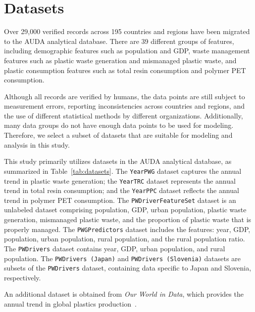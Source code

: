 \section{Datasets}

Over 29{,}000 verified records across 195 countries and regions have been migrated to the AUDA analytical database. There are 39 different groups of features, including demographic features such as population and GDP, waste management features such as plastic waste generation and mismanaged plastic waste, and plastic consumption features such as total resin consumption and polymer PET consumption.

Although all records are verified by humans, the data points are still subject to measurement errors, reporting inconsistencies across countries and regions, and the use of different statistical methods by different organizations. Additionally, many data groups do not have enough data points to be used for modeling. Therefore, we select a subset of datasets that are suitable for modeling and analysis in this study.



This study primarily utilizes datasets in the AUDA analytical database, as summarized in Table~\ref{tab:datasets}. The \texttt{YearPWG} dataset captures the annual trend in plastic waste generation; the \texttt{YearTRC} dataset represents the annual trend in total resin consumption; and the \texttt{YearPPC} dataset reflects the annual trend in polymer PET consumption. The \texttt{PWDriverFeatureSet} dataset is an unlabeled dataset comprising population, GDP, urban population, plastic waste generation, mismanaged plastic waste, and the proportion of plastic waste that is properly managed. The \texttt{PWGPredictors} dataset includes the features: year, GDP, population, urban population, rural population, and the rural population ratio. The \texttt{PWDrivers} dataset contains year, GDP, urban population, and rural population. The \texttt{PWDrivers (Japan)} and \texttt{PWDrivers (Slovenia)} datasets are subsets of the \texttt{PWDrivers} dataset, containing data specific to Japan and Slovenia, respectively.

An additional dataset is obtained from \textit{Our World in Data}, which provides the annual trend in global plastics production~\cite{owid_global_plastics_production}.
